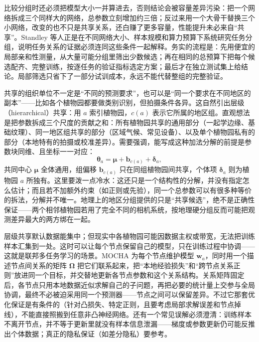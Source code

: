 比较分组时还必须把模型大小一并算进去，否则结论会被容量差异污染：把一个网络拆成三个同样大的网络，总参数立刻增加约三倍；反过来用一个大骨干替换三个小网络，改变的也不只是共享关系，还白赚了更多容量，性能提升未必来自“共享”。Standley 等人正是在不同网络大小、样本规模和算力预算下系统研究任务分组，说明任务关系的证据必须连同这些条件一起解释。务实的流程是：先用便宜的局部亲和性测量，从大量可能分组里筛出少数候选；再在相同的总预算下把每个候选配齐、完整训练，按逐任务的验证指标选定方案；最后才在独立测试集上给结论。局部筛选只省下了一部分试训成本，永远不能代替整组的完整验证。

共享的组织单位不一定是“不同的预测要求”，也可以是“同一个要求在不同地区的副本”——比如各个植物园都要做类别识别，但拍摄条件各异。这自然引出层级（hierarchical）共享：用 $a$ 索引植物园，$c(a)$ 表示它所属的地区组。直观想法是把参数拆成三个尺度的贡献之和：所有植物园共享的通用部分（一起学边缘、基础纹理）、同一地区组共享的部分（区域气候、常见设备）、以及单个植物园私有的部分（本地特有的拍摄或校准差异）。需要强调，能写成这种加法分解的前提是参数块同维、且坐标一一对应：
\begin{equation}
  \bm{\theta}_a
  =\bm{\mu}+\bm b_{c(a)}+\bm\delta_a,
  \label{eq:ket-sharing-hierarchy}
\end{equation}
共同中心 $\bm\mu$ 全体通用，组偏移 $\bm b_{c(a)}$ 只在同组植物园间共享，个体项 $\bm\delta_a$ 则为植物园 $a$ 所独有。这里要泼一点冷水：这还只是一个结构性的分解，并没有指定怎么估计；而且若不加额外约束（如正则或先验），同一个总参数可以有很多种等价的拆法，分解并不唯一。地理上的地区分组提供的只是“共享候选”，绝不是正确性保证——两个相邻植物园若用了完全不同的相机系统，按地理硬分组反而可能把观测差异最大的两方绑在一起。

层级共享默认数据能集中；但现实中各植物园可能因数据主权或带宽，无法把训练样本汇集到一处。这时可以让每个节点保留自己的模型，只在训练过程中协调——这就是联邦多任务学习的场景。MOCHA 为每个节点维护模型 $\bm w_a$，同时用一个描述节点间关系的矩阵 $\bm\Omega$ 把它们联系起来，把“本地经验损失”和“跨节点关系正则”放进同一个目标，并交替地更新各节点参数和这个关系结构。关系矩阵固定后，各节点只用本地数据近似求解自己的子问题，再把必要的统计量上交参与全局协调，最终不必被迫采用同一个预测器——节点之间可以保留差异。不过它那套优化保证是有条件的（针对凸损失、特定正则，且要考虑局部求解误差和节点掉线），不能直接照搬到任意非凸神经网络。还有一个常见误解必须澄清：训练样本不离开节点，并不等于更新里就没有样本信息泄漏——梯度或参数更新仍可能反推出个体数据；真正的隐私保证（如差分隐私）要参考。

